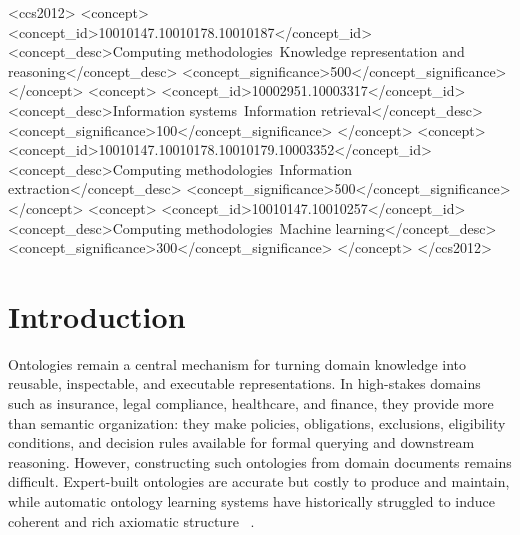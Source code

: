 \documentclass[sigconf]{acmart}
\begin{document}
\begin{CCSXML}
<ccs2012>
   <concept>
       <concept_id>10010147.10010178.10010187</concept_id>
       <concept_desc>Computing methodologies~Knowledge representation and reasoning</concept_desc>
       <concept_significance>500</concept_significance>
       </concept>
   <concept>
       <concept_id>10002951.10003317</concept_id>
       <concept_desc>Information systems~Information retrieval</concept_desc>
       <concept_significance>100</concept_significance>
       </concept>
   <concept>
       <concept_id>10010147.10010178.10010179.10003352</concept_id>
       <concept_desc>Computing methodologies~Information extraction</concept_desc>
       <concept_significance>500</concept_significance>
       </concept>
   <concept>
       <concept_id>10010147.10010257</concept_id>
       <concept_desc>Computing methodologies~Machine learning</concept_desc>
       <concept_significance>300</concept_significance>
       </concept>
 </ccs2012>
\end{CCSXML}






\maketitle

\vspace{-6pt}
\section{Introduction}

Ontologies remain a central mechanism for turning domain knowledge into reusable, inspectable, and executable representations. In high-stakes domains such as insurance, legal compliance, healthcare, and finance, they provide more than semantic organization: they make policies, obligations, exclusions, eligibility conditions, and decision rules available for formal querying and downstream reasoning. However, constructing such ontologies from domain documents remains difficult. Expert-built ontologies are accurate but costly to produce and maintain, while automatic ontology learning systems have 
historically struggled to induce coherent and rich axiomatic structure ~\cite{du2024short,lourdusamy2019survey}.
\end{document}
